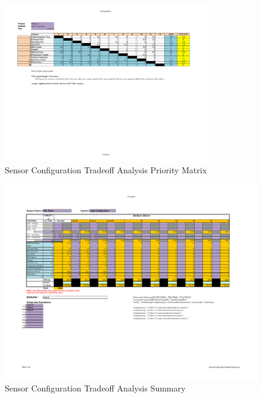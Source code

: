 \begin{figure}[H]
\includegraphics[angle=90,width=0.8\textwidth]{TradeoffAnalysis/SENSOR1.pdf}
\caption[]{Sensor Configuration Tradeoff Analysis Priority Matrix}
\label{fig:sensortradeoff1}
\end{figure}

\begin{figure}[H]
\includegraphics[angle=90,width=\textwidth]{TradeoffAnalysis/SENSOR2.pdf} 
\caption[]{Sensor Configuration Tradeoff Analysis Summary}
\label{fig:sensortradeoff}
\end{figure}